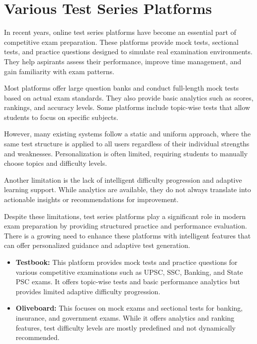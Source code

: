 \begin{sloppypar}
\section{Various Test Series Platforms}

In recent years, online test series platforms have become an essential part of competitive exam preparation. These platforms provide mock tests, sectional tests, and practice questions designed to simulate real examination environments. They help aspirants assess their performance, improve time management, and gain familiarity with exam patterns.

Most platforms offer large question banks and conduct full-length mock tests based on actual exam standards. They also provide basic analytics such as scores, rankings, and accuracy levels. Some platforms include topic-wise tests that allow students to focus on specific subjects.

However, many existing systems follow a static and uniform approach, where the same test structure is applied to all users regardless of their individual strengths and weaknesses. Personalization is often limited, requiring students to manually choose topics and difficulty levels.

Another limitation is the lack of intelligent difficulty progression and adaptive learning support. While analytics are available, they do not always translate into actionable insights or recommendations for improvement.

Despite these limitations, test series platforms play a significant role in modern exam preparation by providing structured practice and performance evaluation. There is a growing need to enhance these platforms with intelligent features that can offer personalized guidance and adaptive test generation.



\begin{itemize}
    \item \textbf{Testbook:} This platform provides mock tests and practice questions for various competitive examinations such as UPSC, SSC, Banking, and State PSC exams. It offers topic-wise tests and basic performance analytics but provides limited adaptive difficulty progression.

    \item \textbf{Oliveboard:} This focuses on mock exams and sectional tests for banking, insurance, and government exams. While it offers analytics and ranking features, test difficulty levels are mostly predefined and not dynamically recommended.


\end{itemize}
\end{sloppypar}

